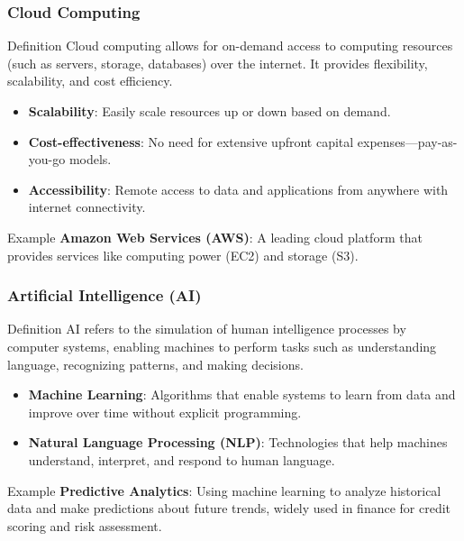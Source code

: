 \documentclass{beamer}
\begin{document}
\begin{frame}[fragile]
    \frametitle{Cloud Computing}
    \begin{block}{Definition}
        Cloud computing allows for on-demand access to computing resources (such as servers, storage, databases) over the internet. It provides flexibility, scalability, and cost efficiency.
    \end{block}
    
    \begin{itemize}
        \item \textbf{Scalability}: Easily scale resources up or down based on demand.
        \item \textbf{Cost-effectiveness}: No need for extensive upfront capital expenses—pay-as-you-go models.
        \item \textbf{Accessibility}: Remote access to data and applications from anywhere with internet connectivity.
    \end{itemize}
    
    \begin{block}{Example}
        \textbf{Amazon Web Services (AWS)}: A leading cloud platform that provides services like computing power (EC2) and storage (S3).
    \end{block}
\end{frame}

\begin{frame}[fragile]
    \frametitle{Artificial Intelligence (AI)}
    \begin{block}{Definition}
        AI refers to the simulation of human intelligence processes by computer systems, enabling machines to perform tasks such as understanding language, recognizing patterns, and making decisions.
    \end{block}
    
    \begin{itemize}
        \item \textbf{Machine Learning}: Algorithms that enable systems to learn from data and improve over time without explicit programming.
        \item \textbf{Natural Language Processing (NLP)}: Technologies that help machines understand, interpret, and respond to human language.
    \end{itemize}
    
    \begin{block}{Example}
        \textbf{Predictive Analytics}: Using machine learning to analyze historical data and make predictions about future trends, widely used in finance for credit scoring and risk assessment.
    \end{block}
\end{frame}
\end{document}
